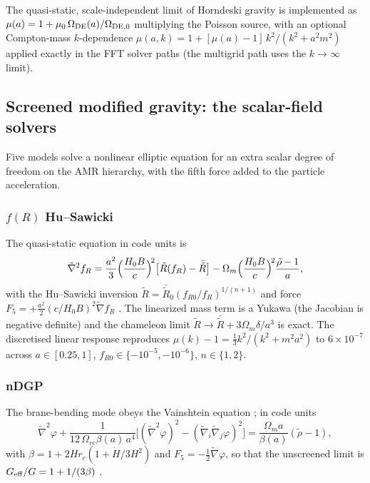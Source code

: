 \documentclass[11pt,a4paper]{article}
\newcommand{\Geff}{G_{\rm eff}}
\begin{document}
The quasi-static, scale-independent limit of Horndeski gravity is
implemented as
$\mu(a)=1+\mu_0\,\Omega_{\rm DE}(a)/\Omega_{\rm DE,0}$
multiplying the Poisson source, with an optional Compton-mass
$k$-dependence
$\mu(a,k)=1+[\mu(a)-1]\,k^2/(k^2+a^2m^2)$ applied exactly in the
FFT solver paths (the multigrid path uses the $k\to\infty$ limit).

\subsection{Screened modified gravity: the scalar-field solvers}
\label{sec:mg}

Five models solve a nonlinear elliptic equation for an extra
scalar degree of freedom on the AMR hierarchy, with the fifth
force added to the particle acceleration.

\subsubsection{$f(R)$ Hu--Sawicki}
The quasi-static equation in code units is
\begin{equation}
\tilde\nabla^2 f_R
= \frac{a^2}{3}\Bigl(\frac{H_0 B}{c}\Bigr)^{\!2}
  \bigl[\tilde R(f_R)-\bar{\tilde R}\bigr]
 -\Omega_m \Bigl(\frac{H_0 B}{c}\Bigr)^{\!2}\frac{\tilde\rho-1}{a},
\end{equation}
with the Hu--Sawicki inversion
$\tilde R = \bar{\tilde R}_0 (f_{R0}/f_R)^{1/(n+1)}$ and force
$F_5=+\tfrac{a^2}{2}(c/H_0B)^2\tilde\nabla f_R$
\citep{HuSawicki2007,Oyaizu2008,Li2012}. The linearized mass term
is a Yukawa (the Jacobian is negative definite) and the chameleon
limit $\tilde R\to\bar{\tilde R}+3\Omega_m\delta/a^3$ is exact.
The discretised linear response reproduces
$\mu(k)-1=\tfrac13 k^2/(k^2+m^2a^2)$ to $6\times10^{-7}$ across
$a\in[0.25,1]$, $f_{R0}\in\{-10^{-5},-10^{-6}\}$, $n\in\{1,2\}$.

\subsubsection{nDGP}
The brane-bending mode obeys the Vainshtein equation
\citep{Schmidt2009,Li2013}; in code units
\begin{equation}
\tilde\nabla^2\varphi
+\frac{1}{12\,\Omega_{rc}\beta(a)\,a^4}
\bigl[(\tilde\nabla^2\varphi)^2-(\tilde\nabla_i\tilde\nabla_j\varphi)^2\bigr]
= \frac{\Omega_m a}{\beta(a)}(\tilde\rho-1),
\end{equation}
with $\beta=1+2Hr_c(1+\dot H/3H^2)$ and $F_5=-\tfrac12\tilde\nabla\varphi$,
so that the unscreened limit is $\Geff/G=1+1/(3\beta)$
\citep{Winther2015}.
\end{document}
